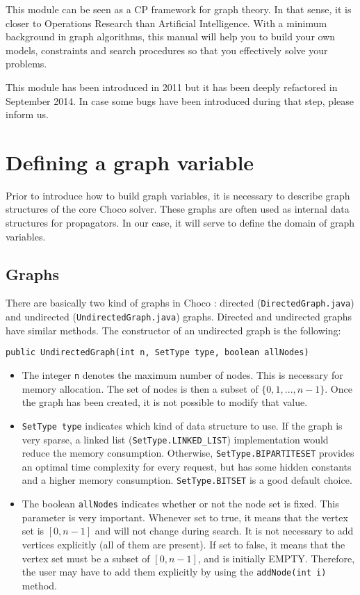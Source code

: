 \documentclass{article}
\begin{document}
This module can be seen as a CP framework for graph theory. In that sense, it is closer to Operations Research than Artificial Intelligence. With a minimum background in graph algorithms, this manual will help you to build your own models, constraints and search procedures so that you effectively solve your problems. 

This module has been introduced in 2011 but it has been deeply refactored in September 2014. In case some bugs have been introduced during that step, please inform us. 

\newpage{}
\section{Defining a graph variable}

Prior to introduce how to build graph variables, it is necessary to describe graph structures of the core Choco solver. These graphs are often used as internal data structures for propagators. In our case, it will serve to define the domain of graph variables. 

\subsection{Graphs}

There are basically two kind of graphs in Choco : directed (\texttt{DirectedGraph.java}) and undirected (\texttt{UndirectedGraph.java}) graphs. 
Directed and undirected graphs have similar methods. The constructor of an undirected graph is the following: 
\begin{lstlisting}
public UndirectedGraph(int n, SetType type, boolean allNodes)
\end{lstlisting}

\begin{itemize}
\item The integer \texttt{n} denotes the maximum number of nodes. This is necessary for memory allocation. The set of nodes is then a subset of $\{0,1,...,n-1\}$. Once the graph has been created, it is not possible to modify that value. 
\item \texttt{SetType type} indicates which kind of data structure to use. If the graph is very sparse, a linked list (\texttt{SetType.LINKED\_LIST}) implementation would reduce the memory consumption. Otherwise, \texttt{SetType.BIPARTITESET} provides an optimal time complexity for every request, but has some hidden constants and a higher memory consumption. \texttt{SetType.BITSET} is a good default choice. 
\item The boolean \texttt{allNodes} indicates whether or not the node set is fixed. This parameter is very important. Whenever set to true, it means that the vertex set is $[0,n-1]$ and will not change during search. It is not necessary to add vertices explicitly (all of them are present). If set to false, it means that the vertex set must be a subset of $[0,n-1]$, and is initially EMPTY. Therefore, the user may have to add them explicitly by using the \texttt{addNode(int i)} method.
\end{itemize}
\end{document}
